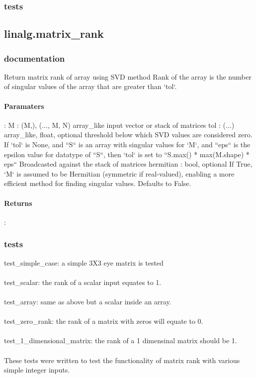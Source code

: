 \documentclass[a4paper,11pt]{article}
\begin{document}
\subsubsection{tests}


\subsection{linalg.matrix\_rank}
\subsubsection{documentation}
Return matrix rank of array using SVD method
Rank of the array is the number of singular values of the array that are
greater than `tol`.
\paragraph{Paramaters}:  M : {(M,), (..., M, N)} array\_like input vector or stack of matrices
tol : (...) array\_like, float, optional
threshold below which SVD values are considered zero. If `tol` is None, and ``S`` is an array with singular values for `M`, and ``eps`` is the epsilon value for datatype of ``S``, then `tol` is set to ``S.max() * max(M.shape) * eps`` Broadcasted against the stack of matrices hermitian : bool, optional If True, `M` is assumed to be Hermitian (symmetric if real-valued),
enabling a more efficient method for finding singular values. Defaults to False.
\paragraph{Returns}: 
\subsubsection{tests}
test\_simple\_case: a simple 3X3 eye matrix is tested \\
\\
test\_scalar: the rank of a scalar input equates to 1. \\
\\
test\_array: same as above but a scalar inside an array. \\
\\
test\_zero\_rank: the rank of a matrix with zeros will equate to 0. \\
\\
test\_1\_dimensional\_matrix: the rank of a 1 dimensinal matrix should be 1. \\
\\
These tests were written to test the functionality of matrix rank with various simple integer inputs. 
\end{document}
